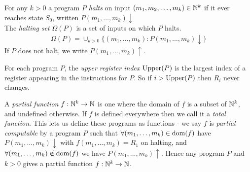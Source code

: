 \documentclass[10pt,a4paper]{article}
\begin{document}
For any $k>0$ a program $P$ \emph{halts} on input $(m_1, m_2, \ldots, m_k) \in \mathbb{N}^k$ if it ever reaches state $S_0$, written $P(m_1,\ldots,m_k)\downarrow$\\
The \emph{halting set} $\Omega(P)$ is a set of inputs on which $P$ halts.
\begin{align*}
\Omega(P) = \cup_{k>0} \{(m_1,\ldots,m_k) : P(m_1,\ldots,m_k)\downarrow\}
\end{align*}
If $P$ does not halt, we write $P(m_1,\ldots,m_k)\uparrow$.

For each program $P$, the \emph{upper register index} $\operatorname{Upper}(P)$ is the largest index of a register appearing in the instructions for $P$. So if $i>\operatorname{Upper}(P)$ then $R_i$ never changes.

A \emph{partial function} $f:\mathbb{N}^k \rightarrow \mathbb{N}$ is one where the domain of $f$ is a subset of $\mathbb{N}^k$, and undefined otherwise. If $f$ is defined everywhere then we call it a \emph{total function}. This lets us define these programs as functions - we say $f$ is \emph{partial computable} by a program $P$ such that $\forall (m_1,\ldots,m_k) \in \operatorname{dom}(f)$ have $P(m_1,\ldots,m_k)\downarrow$ with $f(m_1,\ldots,m_k) = R_1$ on halting, and $\forall (m_1,\ldots,m_k)\notin \operatorname{dom}(f)$ we have $P(m_1,\ldots,m_k)\uparrow$. Hence any program $P$ and $k>0$ gives a partial function $f:\mathbb{N}^k \rightarrow \mathbb{N}$.
\end{document}
